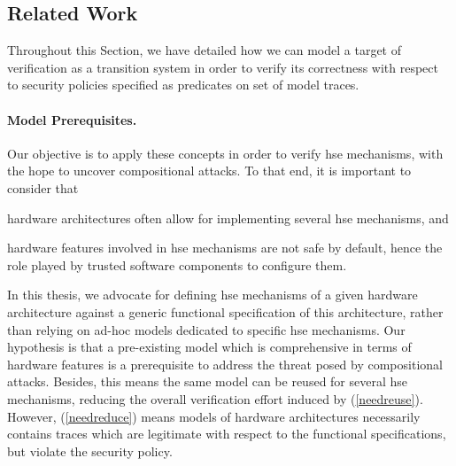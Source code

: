 
\subsection{Related Work}
\label{subsec:sota:ltsrelated}
Throughout this Section, we have detailed how we can model a target of
verification as a transition system in order to verify its correctness with
respect to security policies specified as predicates on set of model traces. 

\paragraph{Model Prerequisites.}
%
Our objective is to apply these concepts in order to verify \ac{hse} mechanisms,
with the hope to uncover compositional attacks.
%
To that end, it is important to consider that
%
\begin{inparaenum}[(1)]
\item \label{needreuse}%
  hardware architectures often allow for implementing several \ac{hse}
  mechanisms, and
\item \label{needreduce}%
  hardware features involved in \ac{hse} mechanisms are not safe by default,
  hence the role played by trusted software components to configure them.
\end{inparaenum}
%
In this thesis, we advocate for defining \ac{hse} mechanisms of a given hardware
architecture against a generic functional specification of this architecture,
rather than relying on ad-hoc models dedicated to specific \ac{hse} mechanisms.
%
Our hypothesis is that a pre-existing model which is comprehensive in terms of
hardware features is a prerequisite to address the threat posed by compositional
attacks.
%
Besides, this means the same model can be reused for several \ac{hse}
mechanisms, reducing the overall verification effort induced by
(\ref{needreuse}).
%
However, (\ref{needreduce}) means models of hardware architectures necessarily
contains traces which are legitimate with respect to the functional
specifications, but violate the security policy.

